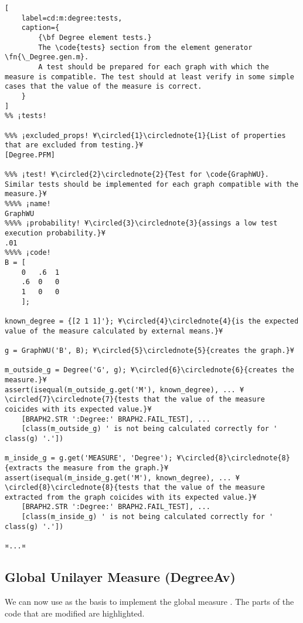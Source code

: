 \documentclass{tufte-handout}
\begin{document}
\begin{lstlisting}[
	label=cd:m:degree:tests,
	caption={
		{\bf Degree element tests.}
		The \code{tests} section from the element generator \fn{\_Degree.gen.m}.
		A test should be prepared for each graph with which the measure is compatible. The test should at least verify in some simple cases that the value of the measure is correct.
	}
]
%% ¡tests!

%%% ¡excluded_props! ¥\circled{1}\circlednote{1}{List of properties that are excluded from testing.}¥
[Degree.PFM] 

%%% ¡test! ¥\circled{2}\circlednote{2}{Test for \code{GraphWU}. Similar tests should be implemented for each graph compatible with the measure.}¥
%%%% ¡name!
GraphWU
%%%% ¡probability! ¥\circled{3}\circlednote{3}{assings a low test execution probability.}¥
.01
%%%% ¡code!
B = [
    0   .6  1
    .6  0   0
    1   0   0
    ];

known_degree = {[2 1 1]'}; ¥\circled{4}\circlednote{4}{is the expected value of the measure calculated by external means.}¥

g = GraphWU('B', B); ¥\circled{5}\circlednote{5}{creates the graph.}¥

m_outside_g = Degree('G', g); ¥\circled{6}\circlednote{6}{creates the measure.}¥
assert(isequal(m_outside_g.get('M'), known_degree), ... ¥\circled{7}\circlednote{7}{tests that the value of the measure coicides with its expected value.}¥ 
    [BRAPH2.STR ':Degree:' BRAPH2.FAIL_TEST], ...
    [class(m_outside_g) ' is not being calculated correctly for ' class(g) '.'])

m_inside_g = g.get('MEASURE', 'Degree'); ¥\circled{8}\circlednote{8}{extracts the measure from the graph.}¥
assert(isequal(m_inside_g.get('M'), known_degree), ... ¥\circled{8}\circlednote{8}{tests that the value of the measure extracted from the graph coicides with its expected value.}¥
    [BRAPH2.STR ':Degree:' BRAPH2.FAIL_TEST], ...
    [class(m_inside_g) ' is not being calculated correctly for ' class(g) '.'])

¤...¤
\end{lstlisting}

\clearpage
\subsection{Global Unilayer Measure (DegreeAv)}

We can now use  as the basis to implement the global measure .
The parts of the code that are modified are highlighted.
\end{document}

